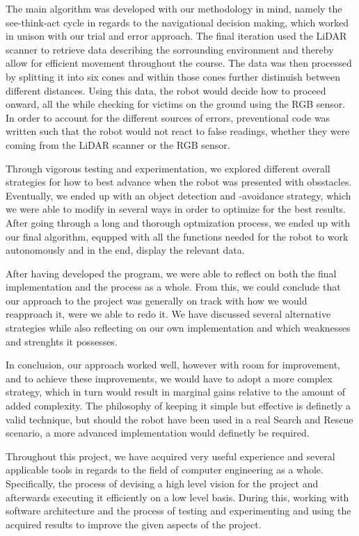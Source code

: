 \documentclass[conference]{IEEEtran}
\begin{document}
The main algorithm was developed with our methodology in mind, namely the see-think-act cycle in regards to the navigational decision making, which worked in unison with our trial and error approach.
The final iteration used the LiDAR scanner to retrieve data describing the sorrounding environment and thereby allow for efficient movement throughout the course.
The data was then processed by splitting it into six cones and within those cones further distinuish between different distances.
Using this data, the robot would decide how to proceed onward, all the while checking for victims on the ground using the RGB sensor.
In order to account for the different sources of errors, preventional code was written such that the robot would not react to false readings, whether they were coming from the LiDAR scanner or the RGB sensor.

Through vigorous testing and experimentation, we explored different overall strategies for how to best advance when the robot was presented with obsstacles.
Eventually, we ended up with an object detection and -avoidance strategy, which we were able to modify in several ways in order to optimize for the best results.
After going through a long and thorough optmization process, we ended up with our final algorithm, equpped with all the functions needed for the robot to work autonomously and in the end, display the relevant data.

After having developed the program, we were able to reflect on both the final implementation and the process as a whole.
From this, we could conclude that our approach to the project was generally on track with how we would reapproach it, were we able to redo it.
We have discussed several alternative strategies while also reflecting on our own implementation and which weaknesses and strenghts it possesses.

In conclusion, our approach worked well, however with room for improvement, and to achieve these improvements, we would have to adopt a more complex strategy, which in turn would result in marginal gains relative to the amount of added complexity.
The philosophy of keeping it simple but effective is definetly a valid technique, but should the robot have been used in a real Search and Rescue scenario, a more advanced implementation would definetly be required.

Throughout this project, we have acquired very useful experience and several applicable tools in regards to the field of computer engineering as a whole.
Specifically, the process of devising a high level vision for the project and afterwards executing it efficiently on a low level basis.
During this, working with software architecture and the process of testing and experimenting and using the acquired results to improve the given aspects of the project.
\end{document}
